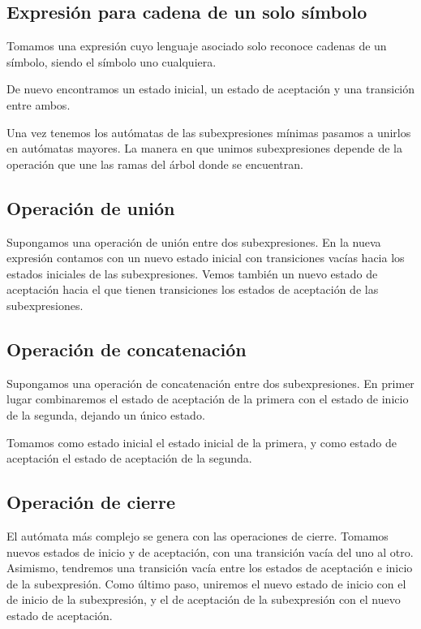 \subsection{Expresión para cadena de un solo símbolo}
Tomamos una expresión cuyo lenguaje asociado solo reconoce cadenas de un símbolo, siendo el símbolo uno cualquiera.


De nuevo encontramos un estado inicial, un estado de aceptación y una transición entre ambos.

Una vez tenemos los autómatas de las subexpresiones mínimas pasamos a unirlos en autómatas mayores.
La manera en que unimos subexpresiones depende de la operación que une las ramas del árbol donde se encuentran.

\subsection{Operación de unión}
Supongamos una operación de unión entre dos subexpresiones.
En la nueva expresión contamos con un nuevo estado inicial con transiciones vacías hacia los estados iniciales de las subexpresiones.
Vemos también un nuevo estado de aceptación hacia el que tienen transiciones los estados de aceptación de las subexpresiones.


\subsection{Operación de concatenación}
Supongamos una operación de concatenación entre dos subexpresiones.
En primer lugar combinaremos el estado de aceptación de la primera con el estado de inicio de la segunda, dejando un único estado.

Tomamos como estado inicial el estado inicial de la primera, y como estado de aceptación el estado de aceptación de la segunda.


\subsection{Operación de cierre}
El autómata más complejo se genera con las operaciones de cierre.
Tomamos nuevos estados de inicio y de aceptación, con una transición vacía del uno al otro.
Asimismo, tendremos una transición vacía entre los estados de aceptación e inicio de la subexpresión.
Como último paso, uniremos el nuevo estado de inicio con el de inicio de la subexpresión, y el de aceptación de la subexpresión con el nuevo estado de aceptación.

